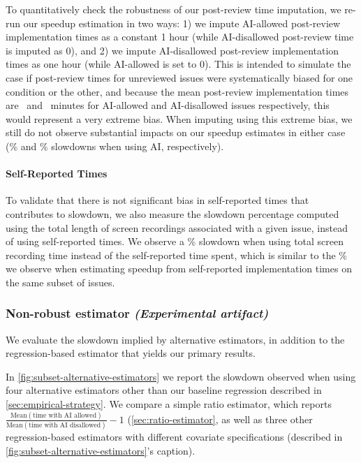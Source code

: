 \documentclass{article}
\begin{document}
To quantitatively check the robustness of our post-review time imputation, we re-run our speedup estimation in two ways: 1) we impute AI-allowed post-review implementation times as a constant 1 hour (while AI-disallowed post-review time is imputed as 0), and 2) we impute AI-disallowed post-review implementation times as one hour (while AI-allowed is set to 0). This is intended to simulate the case if post-review times for unreviewed issues were systematically biased for one condition or the other, and because the mean post-review implementation times are \MeanReviewTimeMinutesAIAllowed\ and \MeanReviewTimeMinutesNoAI\ minutes for AI-allowed and AI-disallowed issues respectively, this would represent a very extreme bias. When imputing using this extreme bias, we still do not observe substantial impacts on our speedup estimates in either case (\PctSpeedupBaselineImputationAddOneHourAIDisallowedIssuesAbsValue \% and \PctSpeedupBaselineImputationAddOneHourAIAllowedIssuesAbsValue \% slowdowns when using AI, respectively).

\paragraph*{Self-Reported Times}

To validate that there is not significant bias in self-reported times that contributes to slowdown, we also measure the slowdown percentage computed using the total length of screen recordings associated with a given issue, instead of using self-reported times. We observe a \PctSpeedupLoomDuration \% slowdown when using total screen recording time instead of the self-reported time spent, which is similar to the \PctSpeedupSelfReportedTimeForThoseWithLoomDuration\% we observe when estimating speedup from self-reported implementation times on the same subset of issues.

\subsubsection{Non-robust estimator \textnormal{\textit{(Experimental artifact)}}}
\label{sec:factor-specific-estimator}

We evaluate the slowdown implied by alternative estimators, in addition to the regression-based estimator that yields our primary results.

In \autoref{fig:subset-alternative-estimators} we report the slowdown observed when using four alternative estimators other than our baseline regression described in \autoref{sec:empirical-strategy}. We compare a simple ratio estimator, which reports $\frac{\text{Mean}(\text{time with AI allowed})}{\text{Mean}(\text{time with AI disallowed})} - 1$ (\autoref{sec:ratio-estimator}, as well as three other regression-based estimators with different covariate specifications (described in \autoref{fig:subset-alternative-estimators}'s caption).
\end{document}
